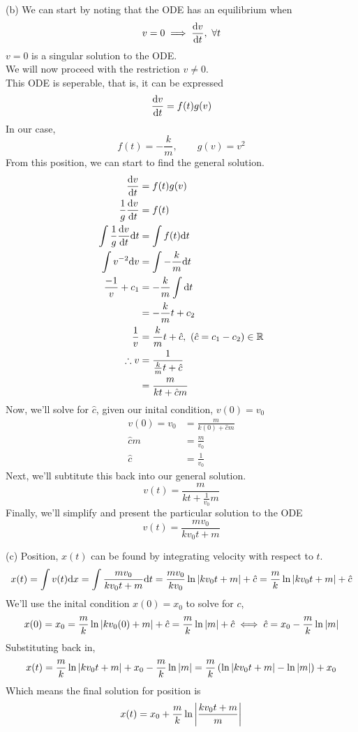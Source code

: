 \documentclass[a4paper, 11pt]{report}
\begin{document}
\sol(b) We can start by noting that the ODE has an equilibrium when
$$
	v=0 \implies \dyd[v]{t},\ \forall t
$$
$v=0$ is a singular solution to the ODE. \\
We will now proceed with the restriction $v\neq 0$. \\
This ODE is seperable, that is, it can be expressed
$$
	\dyd[v]{t} = f(t)g(v)
$$
In our case, 
$$
	f(t) = -\frac{k}{m},\qquad g(v) = v^2
$$
From this position, we can start to find the general solution.
\begin{align*}
	\dyd[v]{t} &= f(t)g(v) \\
	\frac{1}{g}\dyd[v]{t} &= f(t) \\
	\int\frac{1}{g}\dyd[v]{t}\d t &= \int f(t)\d t \\
	\int v^{-2}\d v &= \int -\frac{k}{m} \d t \\
	\frac{-1}{v} + c_1 &= -\frac{k}{m} \int \d t \\
		&= -\frac{k}{m}t + c_2 \\
	\frac{1}{v} &= \frac{k}{m}t + \hat{c},\ (\hat{c} = c_1 - c_2)\in\bbr \\
	\tf v &= \frac{1}{\frac{k}{m}t + \hat{c}} \\
		&= \frac{m}{kt + \hat{c}m}
\end{align*}
Now, we'll solve for $\hat{c}$, given our inital condition, $v(0)=v_0$
\begin{align*}
	v(0) = v_0 &= \frac{m}{k(0) + \hat{c}m} \\
	\hat{c}m &= \frac{m}{v_0} \\
	\hat{c} &= \frac{1}{v_0}
\end{align*}
Next, we'll subtitute this back into our general solution.
$$
	v(t) = \frac{m}{kt + \frac{1}{v_0}m}
$$
Finally, we'll simplify and present the particular solution to the ODE
$$
	v(t) = \frac{mv_0}{kv_0t + m}
$$

\sol (c) Position, $x(t)$ can be found by integrating velocity with respect to $t$.
$$
	x(t) = \int v(t)\d x = \int \frac{mv_0}{kv_0t + m}\d t = \frac{mv_0}{kv_0}\ln\abs{kv_0 t + m} + \hat{c} = \frac{m}{k}\ln\abs{kv_0 t + m} + \hat{c} 
$$
We'll use the inital condition $x(0)=x_0$ to solve for $c$,
$$
	x(0) = x_0 = \frac{m}{k}\ln\abs{kv_0(0) + m} + \hat{c} = \frac{m}{k}\ln\abs{m}+\hat{c} \iff \hat{c} = x_0 - \frac{m}{k}\ln\abs{m} 
$$
Substituting back in,
$$
	x(t) = \frac{m}{k}\ln\abs{kv_0 t + m} + x_0 - \frac{m}{k}\ln\abs{m} = \frac{m}{k}\bracks{\ln\abs{kv_0t + m} - \ln\abs{m}} + x_0
$$
Which means the final solution for position is
$$
	x(t) = x_0 + \frac{m}{k}\ln\abs{\frac{kv_0t + m}{m}}
$$
\end{document}
